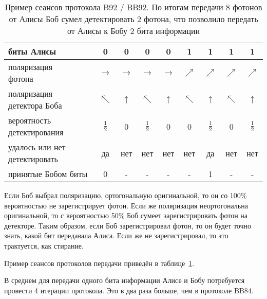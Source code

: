 \begin{table}
    \centering
    \begin{tabular}{|l|c|c|c|c|c|c|c|c|}
        \hline
        \parbox[c][1cm][c]{2,8cm}{биты Алисы} & 0 & 0 & 0 & 0 & 1 & 1 & 1 & 1 \\
        \hline
        \parbox[c][1cm][c]{2,8cm}{поляризация \\ фотона} & $\to$ & $\to$ & $\to$ & $\to$ & $\nearrow$ & $\nearrow$ & $\nearrow$ & $\nearrow$ \\
        \hline
        \parbox[c][1cm][c]{2,8cm}{поляризация \\ детектора Боба} & $\nwarrow$ & $\uparrow$ & $\nwarrow$ & $\uparrow$ & $\nwarrow$ & $\uparrow$ & $\nwarrow$ & $\uparrow$ \\
        \hline
        \parbox[c][1cm][c]{2,8cm}{вероятность детектирования} & $\frac{1}{2}$ & 0 & $\frac{1}{2}$ & 0 & 0 & $\frac{1}{2}$ & 0 & $\frac{1}{2}$ \\
        \hline
        \parbox[c][1cm][c]{2,8cm}{удалось или нет детектировать} & да & нет & нет & нет & нет & да & нет &  нет \\
        \hline
        \parbox[c][1cm][c]{2,8cm}{принятые Бобом биты} & 0 & - & - & - & - & 1 & - & - \\
        \hline
    \end{tabular}
    \caption{Пример сеансов протокола B92 / BB92. По итогам передачи 8 фотонов от Алисы Боб сумел детектировать 2 фотона, что позволило передать от Алисы к Бобу 2 бита информации}
    \label{tab:b92}
\end{table}

Если Боб выбрал поляризацию, ортогональную оригинальной, то он со 100\% вероятностью не зарегистрирует фотон. Если же поляризация неортогональна оригинальной, то с вероятностью 50\% Боб сумеет зарегистрировать фотон на детекторе. Таким образом, если Боб зарегистрировал фотон, то он будет точно знать, какой бит передавала Алиса. Если же не зарегистрировал, то это трактуется, как стирание.

Пример сеансов протоколов передачи приведён в таблице~\ref{tab:b92}.

В среднем для передачи одного бита информации Алисе и Бобу потребуется провести 4 итерации протокола. Это в два раза больше, чем в протоколе BB84.

